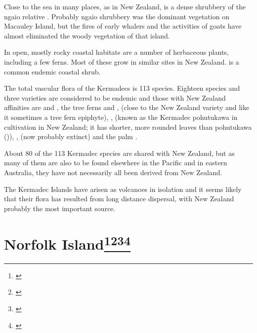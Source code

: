 Close to the sea in many places, as in New Zealand, is a dense shrubbery of the ngaio relative .
Probably ngaio shrubbery was the dominant vegetation on Macauley Island, but the fires of early whalers and the activities of goats have almost eliminated the woody vegetation of that island.

In open, mostly rocky coastal habitats are a number of herbaceous plants, including a few ferns.
Most of these grow in similar sites in New Zealand.  is a common endemic coastal shrub.

The total vascular flora of the Kermadecs is 113 species.
Eighteen species and three varieties are considered to be endemic and those with New Zealand affinities are  and , the tree ferns  and ,   (close to the New Zealand variety and like it sometimes a tree fern epiphyte), , (known as the Kermadec pohutukawa in cultivation in New Zealand; it has shorter, more rounded leaves than pohutukawa ()), ,  (now probably extinct) and the palm .

About 80 of the 113 Kermadec species are shared with New Zealand, but as many of them are also to be found elsewhere in the Pacific and in eastern Australia, they have not necessarily all been derived from New Zealand.

The Kermadec Islands have arisen as volcanoes in isolation and it seems likely that their flora has resulted from long distance dispersal, with New Zealand probably the most important source.

\section[Norfolk Island]{Norfolk Island\footnote{\cite{laing1915revised}}\footnote{\cite{turner1968conservation}}\footnote{\cite{green1970notes}}\footnote{\cite{green1979observations}}}

